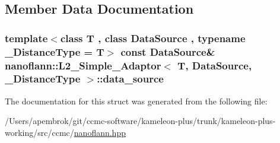\subsection{Member Data Documentation}
\hypertarget{structnanoflann_1_1_l2___simple___adaptor_a43d73454c22f2006e21a7186a67a9537}{
\subsubsection[{data\-\_\-source}]{\setlength{\rightskip}{0pt plus 5cm}template$<$class T , class Data\-Source , typename \-\_\-\-Distance\-Type  = T$>$ const Data\-Source\& {\bf nanoflann\-::\-L2\-\_\-\-Simple\-\_\-\-Adaptor}$<$ T, Data\-Source, \-\_\-\-Distance\-Type $>$\-::data\-\_\-source}}\label{structnanoflann_1_1_l2___simple___adaptor_a43d73454c22f2006e21a7186a67a9537}


The documentation for this struct was generated from the following file\-:\begin{DoxyCompactItemize}
\item 
/\-Users/apembrok/git/ccmc-\/software/kameleon-\/plus/trunk/kameleon-\/plus-\/working/src/ccmc/\hyperlink{nanoflann_8hpp}{nanoflann.\-hpp}\end{DoxyCompactItemize}
